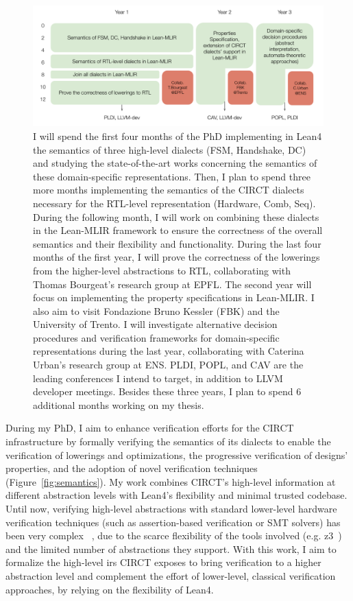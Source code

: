 \documentclass[sigconf,authorversion,nonacm, 11pt]{acmart}
\begin{document}
\begin{figure}[ht]
    \includegraphics[scale=0.8]{logistics.pdf}
    \caption{
        I will spend the first four months of the PhD implementing in Lean4 the semantics of three high-level dialects (FSM, Handshake, DC) and studying the state-of-the-art works concerning the semantics of these domain-specific representations.
        Then, I plan to spend three more months implementing the semantics of the CIRCT dialects necessary for the RTL-level representation (Hardware, Comb, Seq). 
        During the following month, I will work on combining these dialects in the Lean-MLIR framework to ensure the correctness of the overall semantics and their flexibility and functionality. 
        During the last four months of the first year, I will prove the correctness of the lowerings from the higher-level abstractions to RTL, collaborating with Thomas Bourgeat's research group at EPFL. 
        The second year will focus on implementing the property specifications in Lean-MLIR. I also aim to visit Fondazione Bruno Kessler (FBK) and the University of Trento. 
        I will investigate alternative decision procedures and verification frameworks for domain-specific representations during the last year, collaborating with Caterina Urban's research group at ENS. PLDI, POPL, and CAV are the leading conferences I intend to target, in addition to LLVM developer meetings. 
        Besides these three years, I plan to spend 6 additional months working on my thesis.
    }
    \label{fig:logistics}
\end{figure}

During my PhD, I aim to enhance verification efforts for the CIRCT infrastructure by formally verifying the semantics of its dialects to enable the verification of lowerings and optimizations, the progressive verification of designs' properties, and the adoption of novel verification techniques (Figure~\ref{fig:semantics}). 
My work combines CIRCT's high-level information at different abstraction levels with Lean4's flexibility and minimal trusted codebase. 
Until now, verifying high-level abstractions with standard lower-level hardware verification techniques (such as assertion-based verification or SMT solvers) has been very complex ~\cite{symbiyosys, witharana2022survey}, due to the scarce flexibility of the tools involved (e.g. z3~\cite{de2008z3}) and the limited number of abstractions they support. 
With this work, I aim to formalize the high-level \acp{ir} CIRCT exposes to bring verification to a higher abstraction level and complement the effort of lower-level, classical verification approaches, by relying on the flexibility of Lean4.
\end{document}
